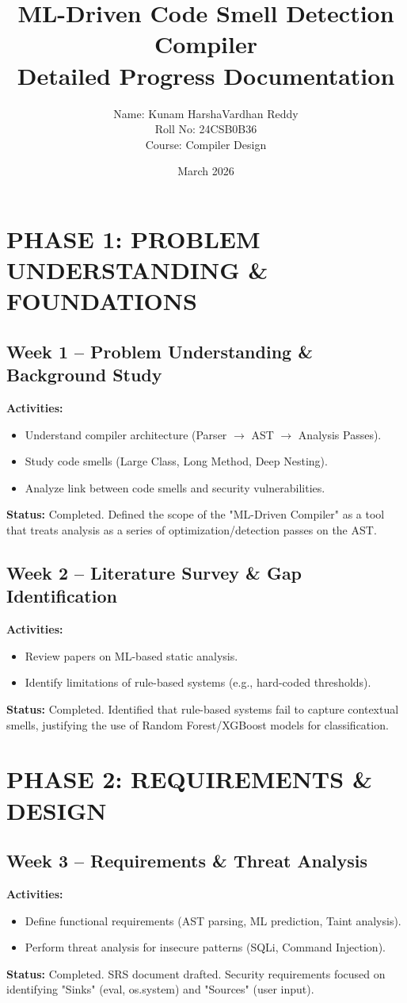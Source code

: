 \documentclass[12pt,a4paper]{article}
\title{ML-Driven Code Smell Detection Compiler \\ \large Detailed Progress Documentation}
\author{Name: Kunam HarshaVardhan Reddy \\ Roll No: 24CSB0B36 \\ Course: Compiler Design}
\date{March 2026}
\begin{document}
\maketitle

\tableofcontents
\newpage

\section{PHASE 1: PROBLEM UNDERSTANDING \& FOUNDATIONS}

\subsection{Week 1 -- Problem Understanding \& Background Study}
\textbf{Activities:}
\begin{itemize}[noitemsep]
    \item Understand compiler architecture (Parser $\rightarrow$ AST $\rightarrow$ Analysis Passes).
    \item Study code smells (Large Class, Long Method, Deep Nesting).
    \item Analyze link between code smells and security vulnerabilities.
\end{itemize}
\textbf{Status:} \textcolor{statuscolor}{Completed}. Defined the scope of the "ML-Driven Compiler" as a tool that treats analysis as a series of optimization/detection passes on the AST.

\subsection{Week 2 -- Literature Survey \& Gap Identification}
\textbf{Activities:}
\begin{itemize}[noitemsep]
    \item Review papers on ML-based static analysis.
    \item Identify limitations of rule-based systems (e.g., hard-coded thresholds).
\end{itemize}
\textbf{Status:} \textcolor{statuscolor}{Completed}. Identified that rule-based systems fail to capture contextual smells, justifying the use of Random Forest/XGBoost models for classification.

\section{PHASE 2: REQUIREMENTS \& DESIGN}

\subsection{Week 3 -- Requirements \& Threat Analysis}
\textbf{Activities:}
\begin{itemize}[noitemsep]
    \item Define functional requirements (AST parsing, ML prediction, Taint analysis).
    \item Perform threat analysis for insecure patterns (SQLi, Command Injection).
\end{itemize}
\textbf{Status:} \textcolor{statuscolor}{Completed}. SRS document drafted. Security requirements focused on identifying "Sinks" (eval, os.system) and "Sources" (user input).
\end{document}
